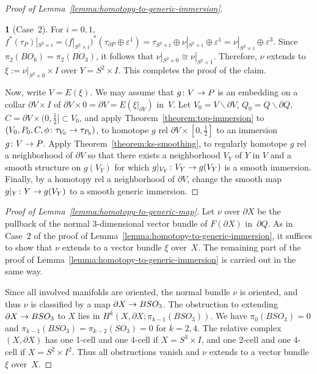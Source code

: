 \documentclass[11pt]{amsart}
\def\to{\mathchoice{\longrightarrow}{\rightarrow}{\rightarrow}{\rightarrow}}
\theoremstyle{definition}
\theoremstyle{theorem-giventitle}
\theoremstyle{definition-giventitle}
\newtheorem{step-named}{}
\numberwithin{equation}{section}
\def\setminus{\smallsetminus}
\begin{document}
\begin{proof}[Proof of Lemma~\ref{lemma:homotopy-to-generic-immersion}]
\begin{step-named}[Case~2]
    For $i=0,1$, $f^*(\tau_P)|_{S^2\times i} = (f|_{S^2\times i})^* (\tau_{\partial P} \oplus \varepsilon^1) = \tau_{S^2\times i} \oplus \nu|_{S^2\times i} \oplus \varepsilon^1 = \nu|_{S^2\times i}\oplus \varepsilon^3$.
    Since $\pi_2(BO_6) = \pi_2(BO_3)$, it follows that $\nu|_{S^2\times 0} \cong \nu|_{S^2\times 1}$.
    Therefore, $\nu$ extends to $\xi:=\nu|_{S^2\times 0}\times I$ over $Y=S^2\times I$.
    This completes the proof of the claim.
  \end{step-named}

  Now, write $V=E(\xi)$.
  We may assume that $g\colon V\to P$ is an embedding on a collar $\partial V\times I$ of $\partial V\times 0 = \partial V = E(\xi|_{\partial Y})$ in~$V$.
  Let $V_0=V\setminus \partial V$, $Q_0=Q\setminus \partial Q$, $C=\partial V\times (0,\frac12] \subset V_0$, and apply Theorem~\ref{theorem:top-immersion} to $(V_0, P_0, C, \phi\colon \tau_{V_0} \to \tau_{P_0})$, to homotope $g$ rel $\partial V\times[0,\frac12]$ to an immersion $g\colon V\to P$.
  Apply Theorem~\ref{theorem:ks-smoothing}, to regularly homotope $g$ rel a neighborhood of $\partial V$ so that there exists a neighborhood $V_Y$ of $Y$ in $V$ and a smooth structure on $g(V_Y)$ for which $g|_{V_Y}\colon V_Y \to g(V_Y)$ is a smooth immersion.
  Finally, by a homotopy rel a neighborhood of $\partial V$, change the smooth map $g|_Y\colon Y\to g(V_Y)$ to a smooth generic immersion.
\end{proof}

\begin{proof}[Proof of Lemma~\ref{lemma:homotopy-to-generic-map}]
  Let $\nu$ over $\partial X$ be the pullback of the normal 3-dimensional vector bundle of $F(\partial X)$ in~$\partial Q$.
  As in Case~2 of the proof of Lemma~\ref{lemma:homotopy-to-generic-immersion}, it suffices to show that $\nu$ extends to a vector bundle $\xi$ over~$X$.
  The remaining part of the proof of Lemma~\ref{lemma:homotopy-to-generic-immersion} is carried out in the same way.

  Since all involved manifolds are oriented, the normal bundle $\nu$ is oriented, and thus $\nu$ is classified by a map $\partial X \to BSO_3$.
  The obstruction to extending $\partial X \to BSO_3$ to $X$ lies in $H^k(X,\partial X;\pi_{k-1}(BSO_3))$.
  We have $\pi_0(BSO_3)=0$ and $\pi_{k-1}(BSO_3)=\pi_{k-2}(SO_3)=0$ for $k=2, 4$.
  The relative complex $(X,\partial X)$ has one 1-cell and one 4-cell if $X=S^3\times I$, and one 2-cell and one 4-cell if $X=S^2\times I^2$.
  Thus all obstructions vanish and $\nu$ extends to a vector bundle $\xi$ over~$X$.
\end{proof}






\renewcommand{\MR}[1]{}


\end{document}
